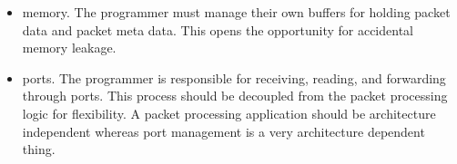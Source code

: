 \begin{itemize}
\item memory. The programmer must manage their own buffers for holding packet
data and packet meta data. This opens the opportunity for accidental
memory leakage.

\item ports. The programmer is responsible for receiving, reading, and forwarding
through ports. This process should be decoupled from the packet processing logic
for flexibility. A packet processing application should be architecture independent
whereas port management is a very architecture dependent thing.
\end{itemize}

%
%
%
%
%

